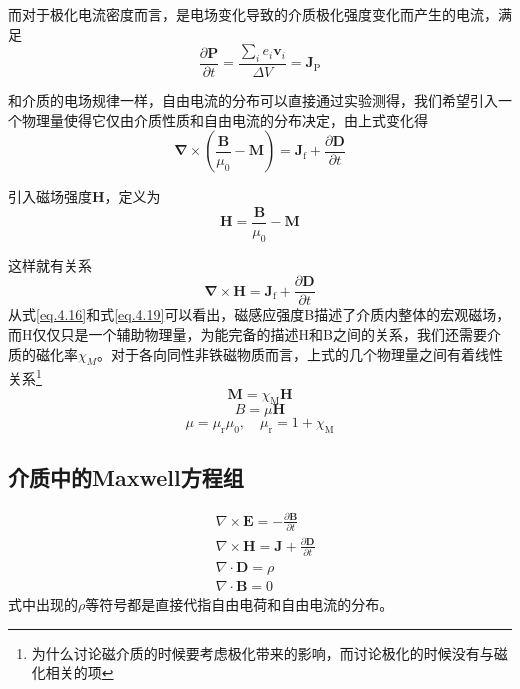 		而对于极化电流密度而言，是电场变化导致的介质极化强度变化而产生的电流，满足
		\begin{equation}
			\frac{\partial \boldsymbol{P}}{\partial t}=\frac{\sum_{i} e_{i} \boldsymbol{v}_{i}}{\Delta V}=\boldsymbol{J}_{\mathrm{P}}
		\end{equation}

		和介质的电场规律一样，自由电流的分布可以直接通过实验测得，我们希望引入一个物理量使得它仅由介质性质和自由电流的分布决定，由上式变化得
		\begin{equation}
			\boldsymbol{\nabla} \times\left(\frac{\boldsymbol{B}}{\mu_{0}}-\boldsymbol{M}\right)=\boldsymbol{J}_{\mathrm{f}}+\frac{\partial \boldsymbol{D}}{\partial t}
		\end{equation}

		引入磁场强度$\mathbf{H}$，定义为
		\begin{equation}
			\mathbf{H}=\frac{\boldsymbol{B}}{\mu_{0}}-\mathbf{M}
		\end{equation}

		这样就有关系
		\begin{equation}
		\label{eq.4.19}
			\boldsymbol{\nabla} \times \mathbf{H}=\boldsymbol{J}_{\mathrm{f}}+\frac{\partial \mathbf{D}}{\partial t}
		\end{equation}
		从式\ref{eq.4.16}和式\ref{eq.4.19}可以看出，磁感应强度B描述了介质内整体的宏观磁场，而H仅仅只是一个辅助物理量，为能完备的描述H和B之间的关系，我们还需要介质的磁化率$\chi_M$。对于各向同性非铁磁物质而言，上式的几个物理量之间有着线性关系\footnote{为什么讨论磁介质的时候要考虑极化带来的影响，而讨论极化的时候没有与磁化相关的项}
		\begin{equation}
			\mathbf{M}=\chi_{\mathrm{M}} \mathbf{H}
		\end{equation}
		\begin{equation}
			B=\mu \mathbf{H}
		\end{equation}
		\begin{equation}
			\mu=\mu_{\mathrm{r}} \mu_{0}, \quad \mu_{\mathrm{r}}=1+\chi_{\mathrm{M}}
		\end{equation}
	\subsection{介质中的Maxwell方程组}
		\begin{equation}
		\boxed{
			\begin{aligned}
			&\nabla \times \boldsymbol{E}=-\frac{\partial \boldsymbol{B}}{\partial t} \\
			&\nabla \times \boldsymbol{H}=\boldsymbol{J}+\frac{\partial \mathbf{D}}{\partial t} \\
			&\nabla \cdot \boldsymbol{D}=\rho \\
			&\nabla \cdot \boldsymbol{B}=0
			\end{aligned}}
		\end{equation}
		式中出现的$\rho$等符号都是直接代指自由电荷和自由电流的分布。

